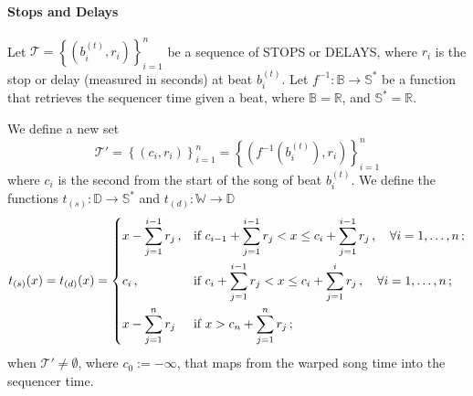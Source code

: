 \documentclass[a4paper,9pt]{article}
\begin{document}
\paragraph{Stops and Delays}
Let $ \mathcal{T} =  \left\{\left( b_i^{(t)}, r_i \right)\right\}_{i=1}^{n} $ be a sequence of STOPS or DELAYS, where $ r_i $ is the stop or delay (measured in seconds) at beat $ b_i^{(t)} $. Let $ f^{-1}:\mathbb{B}\rightarrow \mathbb{S^{*}} $ be a function that retrieves the sequencer time given a beat, where $ \mathbb{B} = \mathbb{R} $, and $ \mathbb{S^{*}} = \mathbb{R}$.

We define a new set 
\begin{equation}
	\mathcal{T'} = \left\{\left( c_i, r_i \right)\right\}_{i=1}^{n} = \left\{\left( f^{-1}\left( b_i^{(t)}\right), r_i \right)\right\}_{i=1}^{n}
	\label{eq:tprimeset}
\end{equation}
where $ c_i $ is the second from the start of the song of beat $ b_i^{(t)} $.
We define the functions $ t_{(s)}: \mathbb{D}\rightarrow \mathbb{S^{*}} $ and $ t_{(d)}: \mathbb{W}\rightarrow \mathbb{D} $
\begin{equation}
	t_{(s)}(x) = t_{(d)}(x) = \begin{dcases}
		x - \sum_{j=1}^{i-1}r_j\,, & \text{if $ c_{i-1} + \sum_{j=1}^{i-1}r_j < x \leq c_i + \sum_{j=1}^{i-1}r_j\,, \quad \forall i=1,\dots,n$}\,;\\
		c_i\,, & \text{if $ c_i + \sum_{j=1}^{i-1}r_j < x \leq c_i + \sum_{j=1}^i r_j\,,\quad \forall i=1,\dots,n $}\,;\\
		x - \sum_{j=1}^n r_j & \text{if $ x > c_n + \sum_{j=1}^n r_j $}\,; 
	\end{dcases}
	\label{eq:t}
\end{equation}
when $ \mathcal{T'} \neq \emptyset $, where $ c_0 := -\infty $,  that maps from the warped song time into the sequencer time. 
\end{document}
